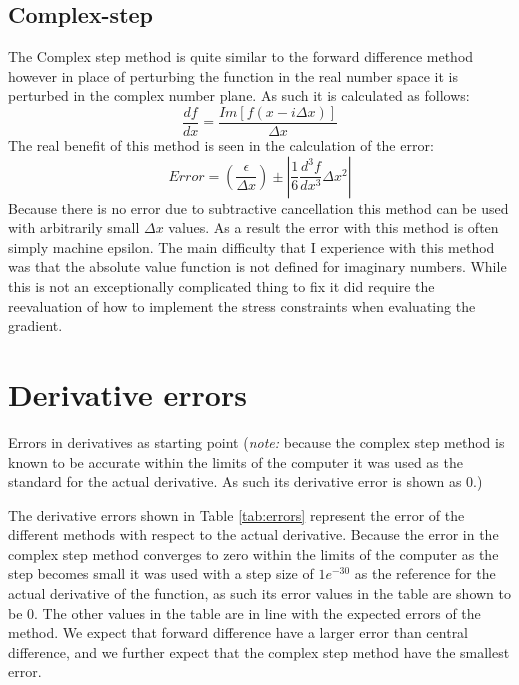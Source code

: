 \documentclass{article}
\begin{document}
\subsection{Complex-step}
The Complex step method is quite similar to the forward difference method however in place of perturbing the function in the real number space it is perturbed in the complex number plane.  As such it is calculated as follows:
\begin{equation}
\frac{df}{dx} = \frac{Im\left[f\left(x - i\Delta x\right)\right]}{\Delta x}
\end{equation}
The real benefit of this method is seen in the calculation of the error:
\begin{equation}
Error = \left(\frac{\epsilon}{\Delta x}\right) \pm \left|\frac{1}{6} \frac{d^3 f}{dx^3}\Delta x^2\right|
\end{equation}
Because there is no error due to subtractive cancellation this method can be used with arbitrarily small $\Delta x$ values.  As a result the error with this method is often simply machine epsilon. The main difficulty that I experience with this method was that the absolute value function is not defined for imaginary numbers.  While this is not an exceptionally complicated thing to fix it did require the reevaluation of how to implement the stress constraints when evaluating the gradient. 

\section{Derivative errors}
\begin{table}[H]
	\begin{center}
	\caption{Errors in derivatives as starting point (\textit{note:}
  because the complex step method is known to be accurate within the limits of
  the computer it was used as the standard for the actual derivative. As such
  its derivative error is shown as 0.)
	}
	\label{tab:errors}
	\noindent{}
	\end{center}
\end{table}
The derivative errors shown in Table \ref{tab:errors} represent the error of the different methods with respect to the actual derivative.
 Because the error in the complex step method converges to zero within the limits
 of the computer as the step becomes small it was used with a step size of $1e^{-30}$ as the reference for the actual derivative of the function,
 as such its error values in the table are shown to be 0.
 The other values in the table are in line with the expected errors of the method.
 We expect that forward difference have a larger error than central difference,
 and we further expect that the complex step method have the smallest error.
\end{document}
